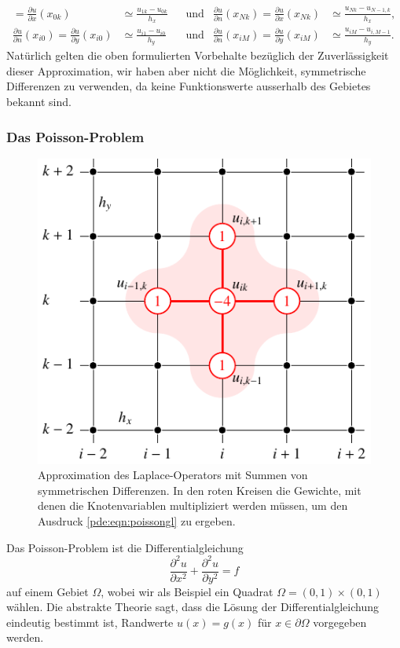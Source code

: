 \begin{beispiel}
\begin{align*}
=
\frac{\partial u}{\partial x}(x_{0k})
&\simeq
\frac{u_{1k}-u_{0k}}{h_x}
&&\text{und}&
\frac{\partial u}{\partial n}(x_{Nk})
=
\frac{\partial u}{\partial x}(x_{Nk})
&\simeq
\frac{u_{Nk}-u_{N-1,k}}{h_x},
\\
\frac{\partial u}{\partial n}(x_{i0})
=
\frac{\partial u}{\partial y}(x_{i0})
&\simeq
\frac{u_{i1}-u_{i0}}{h_y}
&&\text{und}&
\frac{\partial u}{\partial n}(x_{iM})
=
\frac{\partial u}{\partial y}(x_{iM})
&\simeq
\frac{u_{iM}-u_{i,M-1}}{h_y}.
\end{align*}
Natürlich gelten die oben formulierten Vorbehalte bezüglich der
Zuverlässigkeit dieser Approximation, wir haben aber nicht die Möglichkeit,
symmetrische Differenzen zu verwenden, da keine Funktionswerte ausserhalb
des Gebietes bekannt sind.
\end{beispiel}


\subsubsection{Das Poisson-Problem}
\begin{figure}
\centering
\includegraphics{chapters/70-pde/images/laplace.pdf}
\caption{Approximation des Laplace-Operators mit Summen von symmetrischen
Differenzen.
In den roten Kreisen die Gewichte, mit denen die Knotenvariablen 
multipliziert werden müssen, um den Ausdruck
\eqref{pde:eqn:poissongl} zu ergeben.
\label{buch:pde:laplace}}
\end{figure}
Das Poisson-Problem ist die Differentialgleichung
\begin{equation}
\frac{\partial^2 u}{\partial x^2}
+
\frac{\partial^2 u}{\partial y^2}
=
f
\label{buch:pde:poissondgl}
\end{equation}
auf einem Gebiet $\Omega$, wobei wir als Beispiel ein Quadrat
$\Omega = (0,1) \times (0,1)$ wählen.
Die abstrakte Theorie sagt, dass die Lösung der Differentialgleichung
eindeutig bestimmt ist, Randwerte $u(x)=g(x)$ für $x\in\partial\Omega$
vorgegeben werden.

